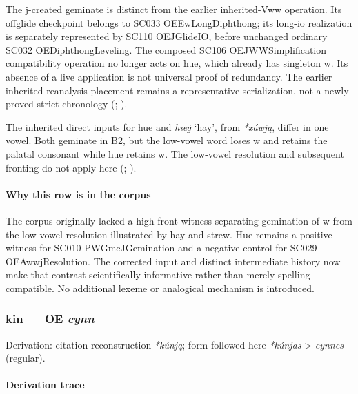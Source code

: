 \documentclass[
  british,
  a4paper,
]{article}
\begin{document}
The j-created geminate is distinct from the earlier inherited-Vww
operation. Its offglide checkpoint belongs to SC033 OEEwLongDiphthong;
its long-io realization is separately represented by SC110 OEJGlideIO,
before unchanged ordinary SC032 OEDiphthongLeveling. The composed SC106
OEJWWSimplification compatibility operation no longer acts on hue, which
already has singleton w. Its absence of a live application is not
universal proof of redundancy. The earlier inherited-reanalysis
placement remains a representative serialization, not a newly proved
strict chronology (;
).

The inherited direct inputs for hue and \emph{hīeġ} `hay', from
\emph{*xáwją}, differ in one vowel. Both geminate in B2, but the
low-vowel word loses w and retains the palatal consonant while hue
retains w. The low-vowel resolution and subsequent fronting do not apply
here (;
).

\paragraph{Why this row is in the
corpus}\label{why-this-row-is-in-the-corpus}

The corpus originally lacked a high-front witness separating gemination
of w from the low-vowel resolution illustrated by hay and strew. Hue
remains a positive witness for SC010 PWGmcJGemination and a negative
control for SC029 OEAwwjResolution. The corrected input and distinct
intermediate history now make that contrast scientifically informative
rather than merely spelling-compatible. No additional lexeme or
analogical mechanism is introduced.

\subsubsection{\texorpdfstring{kin --- OE
\emph{cynn}}{kin --- OE cynn}}\label{kin-oe-cynn}

Derivation: citation reconstruction \emph{*kúnją}; form followed here
\emph{*kúnjas} \textgreater{} \emph{cynnes} (regular).

\paragraph{Derivation trace}\label{derivation-trace-49}
\end{document}
